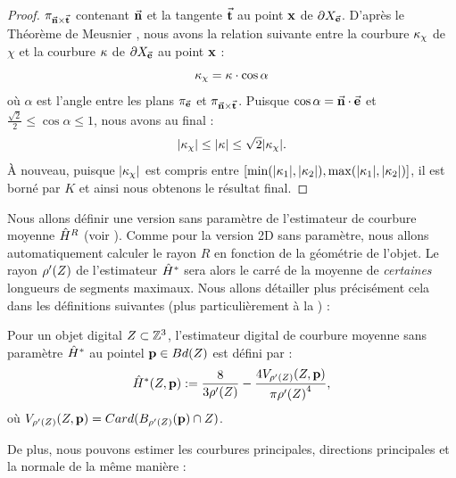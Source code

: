 \begin{proof}
  $\pi_{\vec{\mathbf{n}} \times \vec{\mathbf{t}}}$ contenant $\vec{\mathbf{n}}$ et la
  tangente $\vec{\mathbf{t}}$ au point $\mathbf{x}$ de $\partial X_{\vec{\mathbf{e}}}$. D'après le
  Théorème de Meusnier \cite{Berger1992}, nous avons la relation suivante entre la
  courbure $\kappa_\chi$ de $\chi$ et la courbure $\kappa$ de $\partial X_{\vec{\mathbf{e}}}$ au
  point $\mathbf{x}$ :
  \begin{equation}
    \kappa_\chi = \kappa \cdot \cos \alpha
  \end{equation}
  où $\alpha$ est l'angle entre les plans $\pi_{\vec{\mathbf{e}}}$ et
  $\pi_{\vec{\mathbf{n}} \times \vec{\mathbf{t}}}$. Puisque $\cos \alpha =
  \vec{\mathbf{n}} \cdot \vec{\mathbf{e}}$ et $\frac{\sqrt{2}}{2} \leq \cos \alpha \leq
  1 $, nous avons au final :
  \begin{equation}
    |\kappa_\chi| \le |\kappa| \le \sqrt{2}|\kappa_\chi|.
  \end{equation}
  À nouveau, puisque  $|\kappa_\chi|$ est compris entre $\lbrack
  \min(|\kappa_{1}|,|\kappa_{2}|),
  \max(|\kappa_{1}|,|\kappa_{2}|)\rbrack$,  il est borné par $K$ et ainsi
  nous obtenons le résultat final.
\end{proof}
%
Nous allons définir une version sans paramètre de l'estimateur de courbure
moyenne $\hat{H}^{R}$ (voir ).
Comme pour la version 2D sans paramètre, nous allons automatiquement calculer le
rayon $R$ en fonction de la géométrie de l'objet. Le rayon $\rho'(Z)$ de
l'estimateur $\hat{H}^{*}$ sera alors le carré de la moyenne de \emph{certaines}
longueurs de segments maximaux. Nous allons détailler plus précisément cela
dans les définitions suivantes (plus particulièrement à la ) :
%
\begin{definition}
  Pour un objet digital $Z \subset \mathbb{Z}^3$, l'estimateur digital de
  courbure moyenne sans paramètre $\hat{H}^{*}$ au pointel $\mathbf{p} \in
  Bd({Z})$ est défini par :
  \begin{equation}
    \hat{H}^{*}( Z, \mathbf{p} ) := \frac{8}{3 {\rho'(Z)}} - \frac{4 V_{{\rho'(Z)}}(Z, \mathbf{p})}{\pi{{\rho'(\ensuremath{Z})}}^4} ,
    \label{def:curvature-estimator-3d-mean-pf}
  \end{equation}
  où $V_{\rho'(Z)}(Z, \mathbf{p}) = Card(B_{\rho'(Z)}(\mathbf{p}) \cap Z)$.
\end{definition}
%
De plus, nous pouvons estimer les courbures principales, directions principales
et la normale de la même manière :
